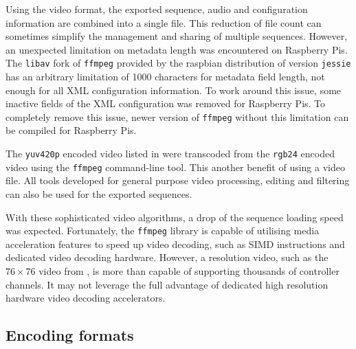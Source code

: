 Using the video format, the exported sequence, audio and configuration information are combined into a single file. This reduction of file count can sometimes simplify the management and sharing of multiple sequences. However, an unexpected limitation on metadata length was encountered on Raspberry Pis. The \texttt{libav} fork of \texttt{ffmpeg} provided by the raspbian distribution of version \texttt{jessie} has an arbitrary limitation of 1000 characters for metadata field length, not enough for all XML configuration information. To work around this issue, some inactive fields of the XML configuration was removed for Raspberry Pis. To completely remove this issue, newer version of \texttt{ffmpeg} without this limitation can be compiled for Raspberry Pis.

The \texttt{yuv420p} encoded video listed in  were transcoded from the \texttt{rgb24} encoded video using the \texttt{ffmpeg} command-line tool. This  another benefit of using a video file. All tools developed for general purpose video processing, editing and filtering can also be used for the exported sequences.

With these sophisticated video  algorithms, a drop of the sequence loading speed was expected. Fortunately, the \texttt{ffmpeg} library is capable of utilising media acceleration features to speed up video decoding, such as SIMD instructions and dedicated video decoding hardware. However, a  resolution video, such as the $76 \times 76$ video from , is more than capable of supporting thousands of controller channels. It may not leverage the full advantage of dedicated high resolution hardware video decoding accelerators.

\subsection{Encoding formats}

